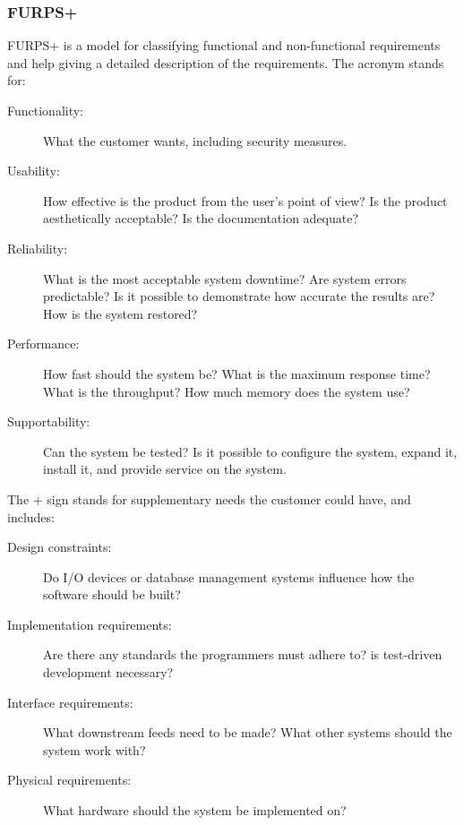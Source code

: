 \subsubsection{FURPS+}
FURPS+ is a model for classifying functional and non-functional requirements and
help giving a detailed description of the requirements. \cite{furps} The acronym stands for: 

\begin{description}
    \item [Functionality:] What the customer wants, including security measures.

    \item [Usability:] How effective is the product from the user's point of
    view? Is the product aesthetically acceptable? Is the documentation adequate?

    \item [Reliability:] What is the most acceptable system downtime? Are system
    errors predictable? Is it possible to demonstrate how accurate the results
    are? How is the system restored?

    \item [Performance:] How fast should the system be? What is the maximum
    response time? What is the throughput? How much memory does the system use?

    \item [Supportability:] Can the system be tested? Is it possible to
    configure the system, expand it, install it, and provide service on the
    system.
\end{description}

The + sign stands for supplementary needs the customer could have, and includes:

\begin{description}
    \item [Design constraints:] Do I/O devices or database management systems
    influence how the software should be built?

    \item [Implementation requirements:] Are there any standards the programmers
    must adhere to? is test-driven development necessary?

    \item [Interface requirements:] What downstream feeds need to be made? What
    other systems should the system work with?

    \item [Physical requirements:] What hardware should the system be
    implemented on?
\end{description}
